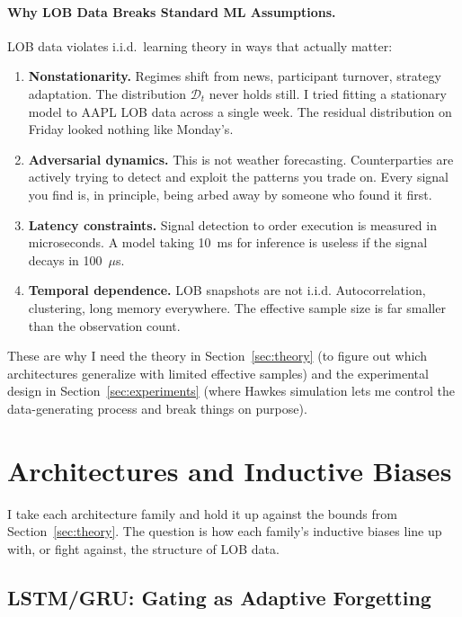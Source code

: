 \documentclass[11pt]{article}
\theoremstyle{definition}
\theoremstyle{remark}
\newcommand{\cD}{\mathcal{D}}
\begin{document}
\paragraph{Why LOB Data Breaks Standard ML Assumptions.}
LOB data violates i.i.d.\ learning theory in ways that actually matter:
\begin{enumerate}
    \item \textbf{Nonstationarity.}  Regimes shift from news, participant turnover, strategy adaptation.  The distribution $\cD_t$ never holds still.  I tried fitting a stationary model to AAPL LOB data across a single week.  The residual distribution on Friday looked nothing like Monday's.
    \item \textbf{Adversarial dynamics.}  This is not weather forecasting.  Counterparties are actively trying to detect and exploit the patterns you trade on.  Every signal you find is, in principle, being arbed away by someone who found it first.
    \item \textbf{Latency constraints.}  Signal detection to order execution is measured in microseconds.  A model taking 10~ms for inference is useless if the signal decays in 100~$\mu$s.
    \item \textbf{Temporal dependence.}  LOB snapshots are not i.i.d.  Autocorrelation, clustering, long memory everywhere.  The effective sample size is far smaller than the observation count.
\end{enumerate}

These are why I need the theory in Section~\ref{sec:theory} (to figure out which architectures generalize with limited effective samples) and the experimental design in Section~\ref{sec:experiments} (where Hawkes simulation lets me control the data-generating process and break things on purpose).


\section{Architectures and Inductive Biases}\label{sec:architectures}

I take each architecture family and hold it up against the bounds from Section~\ref{sec:theory}.
The question is how each family's inductive biases line up with, or fight against, the structure of LOB data.

\subsection{LSTM/GRU: Gating as Adaptive Forgetting}\label{sec:arch:lstm}
\end{document}
